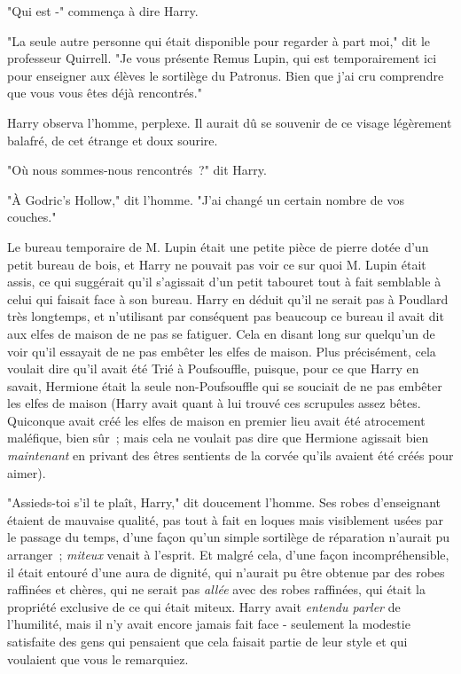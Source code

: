 "Qui est -" commença à dire Harry.

"La seule autre personne qui était disponible pour regarder à part moi," dit le professeur Quirrell. "Je vous présente Remus Lupin, qui est temporairement ici pour enseigner aux élèves le sortilège du Patronus. Bien que j'ai cru comprendre que vous vous êtes déjà rencontrés."

Harry observa l'homme, perplexe. Il aurait dû se souvenir de ce visage légèrement balafré, de cet étrange et doux sourire.

"Où nous sommes-nous rencontrés~?" dit Harry.

"À Godric's Hollow," dit l'homme. "J'ai changé un certain nombre de vos couches."

\later

Le bureau temporaire de M. Lupin était une petite pièce de pierre dotée d'un petit bureau de bois, et Harry ne pouvait pas voir ce sur quoi M. Lupin était assis, ce qui suggérait qu'il s'agissait d'un petit tabouret tout à fait semblable à celui qui faisait face à son bureau. Harry en déduit qu'il ne serait pas à Poudlard très longtemps, et n'utilisant par conséquent pas beaucoup ce bureau il avait dit aux elfes de maison de ne pas se fatiguer. Cela en disant long sur quelqu'un de voir qu'il essayait de ne pas embêter les elfes de maison. Plus précisément, cela voulait dire qu'il avait été Trié à Poufsouffle, puisque, pour ce que Harry en savait, Hermione était la seule non-Poufsouffle qui se souciait de ne pas embêter les elfes de maison (Harry avait quant à lui trouvé ces scrupules assez bêtes. Quiconque avait créé les elfes de maison en premier lieu avait été atrocement maléfique, bien sûr~; mais cela ne voulait pas dire que Hermione agissait bien \emph{maintenant} en privant des êtres sentients de la corvée qu'ils avaient été créés pour aimer).

"Assieds-toi s'il te plaît, Harry," dit doucement l'homme. Ses robes d'enseignant étaient de mauvaise qualité, pas tout à fait en loques mais visiblement usées par le passage du temps, d'une façon qu'un simple sortilège de réparation n'aurait pu arranger~; \emph{miteux} venait à l'esprit. Et malgré cela, d'une façon incompréhensible, il était entouré d'une aura de dignité, qui n'aurait pu être obtenue par des robes raffinées et chères, qui ne serait pas \emph{allée} avec des robes raffinées, qui était la propriété exclusive de ce qui était miteux. Harry avait \emph{entendu parler} de l'humilité, mais il n'y avait encore jamais fait face - seulement la modestie satisfaite des gens qui pensaient que cela faisait partie de leur style et qui voulaient que vous le remarquiez.

